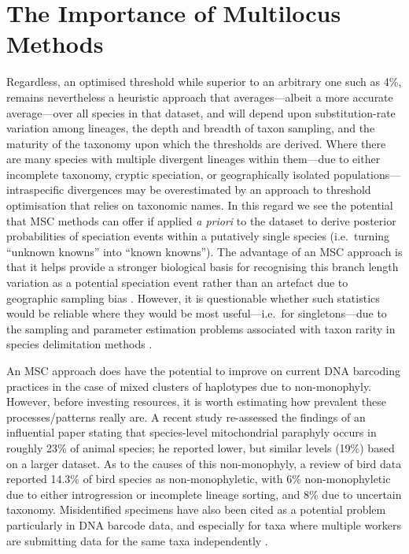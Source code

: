 \documentclass[12pt]{article}
\begin{document}
\section*{The Importance of Multilocus Methods}

Regardless, an optimised threshold while superior to an arbitrary one such as 4\%, remains nevertheless a heuristic approach that averages---albeit a more accurate average---over all species in that dataset, and will depend upon substitution-rate variation among lineages, the depth and breadth of taxon sampling, and the maturity of the taxonomy upon which the thresholds are derived. Where there are many species with multiple divergent lineages within them---due to either incomplete taxonomy, cryptic speciation, or geographically isolated populations---intraspecific divergences may be overestimated by an approach to threshold optimisation that relies on taxonomic names. In this regard we see the potential that MSC methods can offer if applied \emph{a priori} to the dataset to derive posterior probabilities of speciation events within a putatively single species (i.e.\ turning ``unknown knowns'' into ``known knowns''). The advantage of an MSC approach is that it helps provide a stronger biological basis for recognising this branch length variation as a potential speciation event rather than an artefact due to geographic sampling bias \citep{Bergsten2012}. However, it is questionable whether such statistics would be reliable where they would be most useful---i.e.\ for singletons---due to the sampling and parameter estimation problems associated with taxon rarity in species delimitation  methods \citep{Lim2012}.

An MSC approach does have the potential to improve on current DNA barcoding practices in the case of mixed clusters of haplotypes due to non-monophyly. However, before investing resources, it is worth estimating how prevalent these processes/patterns really are. A recent study \citep{Ross2014} re-assessed the findings of an influential paper \citep{Funk2003} stating that species-level mitochondrial paraphyly occurs in roughly 23\% of animal species; he reported lower, but similar levels (19\%) based on a larger dataset. As to the causes of this non-monophyly, a review of bird data \citep{McKay2010} reported 14.3\% of bird species as non-monophyletic, with 6\% non-monophyletic due to either introgression or incomplete lineage sorting, and 8\% due to uncertain taxonomy. Misidentified specimens have also been cited as a potential problem particularly in DNA barcode data, and especially for taxa where multiple workers are submitting data for the same taxa independently \citep{Collins2013}. 
\end{document}

